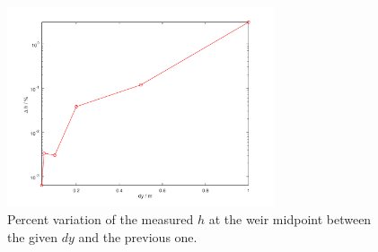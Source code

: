 \begin{figure}[h]
  \centering
  \includegraphics[width=0.7\textwidth]{Figures/diff_center.png}
  \caption{Percent variation of the measured $h$ at the weir midpoint between the given $dy$ and the previous one.}
  \label{fig:diff_center}
\end{figure}


